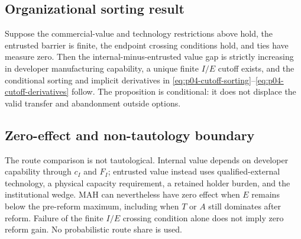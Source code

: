 \subsection{Organizational sorting result}
\label{subsec:p04-sorting-proposition}

Suppose the commercial-value and technology restrictions above hold,
the entrusted barrier is finite, the endpoint crossing conditions hold, and
ties have measure zero. Then the internal-minus-entrusted value gap is strictly
increasing in developer manufacturing capability, a unique finite \(I/E\)
cutoff exists, and the conditional sorting and implicit derivatives in
\eqref{eq:p04-cutoff-sorting}--\eqref{eq:p04-cutoff-derivatives} follow.
The proposition is conditional: it does not displace the valid transfer and
abandonment outside options.

\subsection{Zero-effect and non-tautology boundary}
\label{subsec:p04-zero-effect}

The route comparison is not tautological. Internal value depends on
developer capability through \(c_I\) and \(F_I\); entrusted value instead uses
qualified-external technology, a physical capacity requirement, a retained
holder burden, and the institutional wedge. MAH can nevertheless have zero
effect when \(E\) remains below the pre-reform maximum, including when
\(T\) or \(A\) still dominates after reform. Failure of the finite
\(I/E\) crossing condition alone does not imply zero reform gain.
No probabilistic route share is used.
